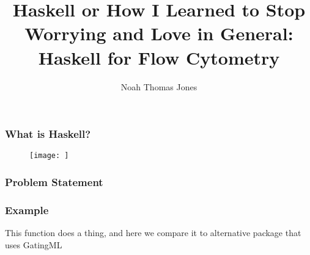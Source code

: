 \documentclass{beamer}
\title{Haskell or How I Learned to Stop Worrying and Love in General: Haskell for Flow Cytometry}
\author{Noah Thomas Jones}
\institute{University of Florida}
\date{}
\begin{document}
\frame{\titlepage}

\begin{frame}
  \frametitle{What is Haskell?}
  \begin{figure}
    \centering
    \texttt{[image: ]}
    \caption{}
  \end{figure}
\end{frame}

\begin{frame}
  \frametitle{Problem Statement}
\end{frame}

\begin{frame}[fragile]
  \frametitle{Example}
  This function does a thing, and here we compare it to alternative package that uses GatingML
    \begin{verbatim}
    \end{verbatim}
\end{frame}


\nocite{*}


\end{document}
